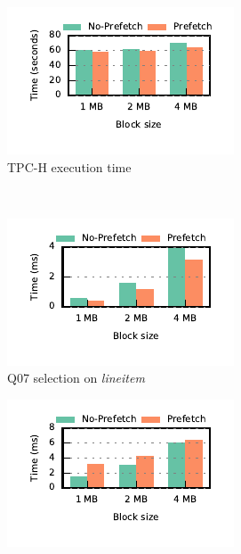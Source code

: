 \begin{figure}[t]
	\centering 
	\begin{subfigure}[ht]{0.4\textwidth}
		\includegraphics[width=\textwidth]{pipeline/figures/prefetching-total-execution-time-withlip-rowstore}
		\caption{TPC-H execution time}
		\label{fig:prefetching-total}
	\end{subfigure}
	~
	\begin{subfigure}[ht]{0.4\textwidth}
		\includegraphics[width=\textwidth]{pipeline/figures/prefetching-q07-select-withlip-rowstore}
		\caption{Q07 selection on \textit{lineitem}}
		\label{fig:prefetching-select-q07}
	\end{subfigure}
	\begin{subfigure}[ht]{0.4\textwidth}
		\includegraphics[width=\textwidth]{pipeline/figures/prefetching-q07-build-withlip-rowstore}

\end{subfigure}
\end{figure}
